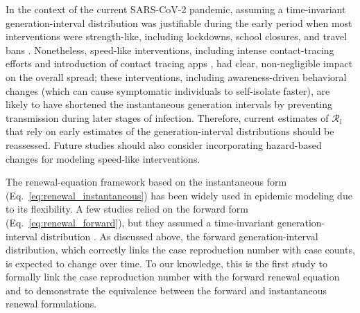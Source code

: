 \documentclass[12pt]{article}
\newcommand{\comment}{}
\renewcommand{\comment}{\showcomment}
\renewcommand{\comment}{\nocomment}
\newcommand{\showcomment}[3]{\textcolor{#1}{\textbf{[#2: }\textsl{#3}\textbf{]}}}
\newcommand{\nocomment}[3]{}
\newcommand{\swp}[1]{\comment{magenta}{SWP}{#1}}
\newcommand{\eref}[1]{Eq.~\ref{eq:#1}}
\newcommand{\Rx}[1]{\ensuremath{{\mathcal R}_{#1}}\xspace}
\newcommand{\Ri}{\Rx{\mathrm{i}}}
\newcommand{\RR}{\ensuremath{{\mathcal R}}\xspace}
\begin{document}
In the context of the current SARS-CoV-2 pandemic, assuming a time-invariant generation-interval distribution was justifiable during the early period when most interventions were strength-like, including lockdowns, school closures, and travel bans \citep{flaxman2020estimating,li2021temporal,brauner2021inferring}.
Nonetheless, speed-like  interventions, including intense contact-tracing efforts \citep{park2020contact} and introduction of contact tracing apps \citep{wymant2021introduction}, had clear, non-negligible impact on the overall spread;
these interventions, including awareness-driven behavioral changes (which can cause symptomatic individuals to self-isolate faster), are likely to have shortened the instantaneous generation intervals by preventing transmission during later stages of infection.
Therefore, current estimates of $\Ri$ that rely on early estimates of the generation-interval distributions should be reassessed.
Future studies should also consider incorporating hazard-based changes for modeling speed-like interventions.


The renewal-equation framework based on the instantaneous form (\eref{renewal_instantaneous}) has been widely used in epidemic modeling due to its flexibility.
A few studies relied on the forward form (\eref{renewal_forward}), but they assumed a time-invariant generation-interval distribution \citep{nishiura2007time,alvarez2020variational,white2021statistical}.
As discussed above, the forward generation-interval distribution, which correctly links the case reproduction number with case counts, is expected to change over time.
To our knowledge, this is the first study to formally link the case reproduction number with the forward renewal equation and to demonstrate the equivalence between the forward and instantaneous renewal formulations.
\end{document}
